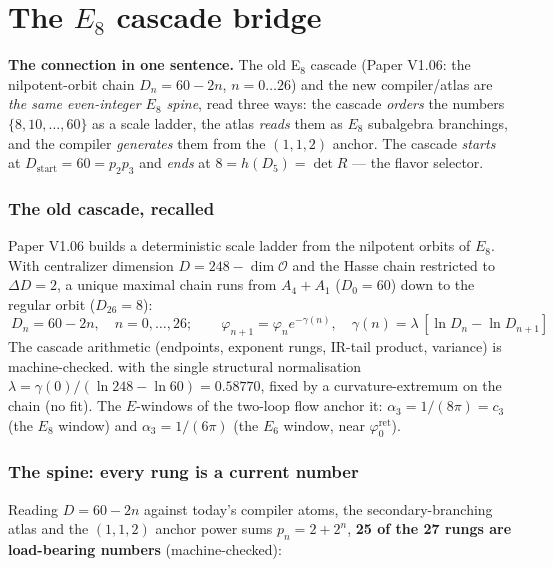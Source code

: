 \documentclass[11pt,a4paper]{article}
\newcommand{\cthree}{c_3}
\newcommand{\phiz}{\varphi_0^{\mathrm{ret}}}
\theoremstyle{definition}
\begin{document}
\clearpage
\part{The $E_8$ cascade bridge}
\noindent\textbf{The connection in one sentence.}
The old E$_8$ cascade (Paper V1.06: the nilpotent-orbit chain $D_n=60-2n$, $n=0\ldots26$) and the new
compiler/atlas are \emph{the same even-integer $E_8$ spine}, read three ways: the cascade \emph{orders}
the numbers $\{8,10,\dots,60\}$ as a scale ladder, the atlas \emph{reads} them as $E_8$ subalgebra
branchings, and the compiler \emph{generates} them from the $(1,1,2)$ anchor. The cascade \emph{starts}
at $D_{\mathrm{start}}=60=p_2p_3$ and \emph{ends} at $8=h(D_5)=\det R$ --- the flavor selector.

\section{The old cascade, recalled}
Paper V1.06 builds a deterministic scale ladder from the nilpotent orbits of $E_8$. With centralizer
dimension $D=248-\dim\mathcal O$ and the Hasse chain restricted to $\Delta D=2$, a unique maximal chain
runs from $A_4{+}A_1$ ($D_0=60$) down to the regular orbit ($D_{26}=8$):
\[
  \boxed{\ D_n=60-2n,\quad n=0,\dots,26;\qquad \varphi_{n+1}=\varphi_n e^{-\gamma(n)},\quad
  \gamma(n)=\lambda\,[\ln D_n-\ln D_{n+1}]\ }
\]
\noindent The cascade arithmetic (endpoints, exponent rungs, IR-tail product, variance) is
machine-checked.
with the single structural normalisation $\lambda=\gamma(0)/(\ln248-\ln60)=0.58770$, fixed by a
curvature-extremum on the chain (no fit). The $E$-windows of the two-loop flow anchor it: $\alpha_3=1/(8\pi)=\cthree$
(the $E_8$ window) and $\alpha_3=1/(6\pi)$ (the $E_6$ window, near $\phiz$).

\section{The spine: every rung is a current number}
Reading $D=60-2n$ against today's compiler atoms, the secondary-branching atlas and the $(1,1,2)$ anchor
power sums $p_n=2+2^n$, \textbf{25 of the 27 rungs are load-bearing numbers} (machine-checked):
\end{document}

